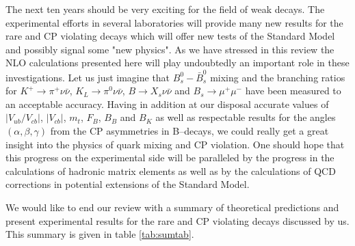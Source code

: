 The next ten years should be very exciting for the field of weak
decays.  The experimental efforts in several laboratories will provide
many new results for the rare and CP violating decays which will offer
new tests of the Standard Model and possibly signal some "new
physics".  As we have stressed in this review the NLO calculations
presented here will play undoubtedly an important role in these
investigations. Let us just imagine that $B_s^0-\bar B_s^0$ mixing and
the branching ratios for $K^+ \to \pi^+\nu\bar\nu$, $K_L\to \pi^0
\nu\bar\nu$, $B \to X_s \nu \bar\nu$ and $B_s \to \mu^+\mu^-$ have been
measured to an acceptable accuracy.  Having in addition at our disposal
accurate values of $|V_{ub}/V_{cb}|$, $|V_{cb}|$, $m_t$, $F_B$, $B_B$
and $B_K$ as well as respectable results for the angles
$(\alpha,\beta,\gamma)$ from the CP asymmetries in B--decays, we could
really get a great insight into the physics of quark mixing and CP
violation. One should hope that this progress on the experimental side
will be paralleled by the progress in the calculations of hadronic
matrix elements as well as by the calculations of QCD corrections in
potential extensions of the Standard Model.

We would like to end our review with a summary of theoretical
predictions and present experimental results for the rare and CP
violating decays discussed by us. This summary is given in table
\ref{tab:sumtab}.

